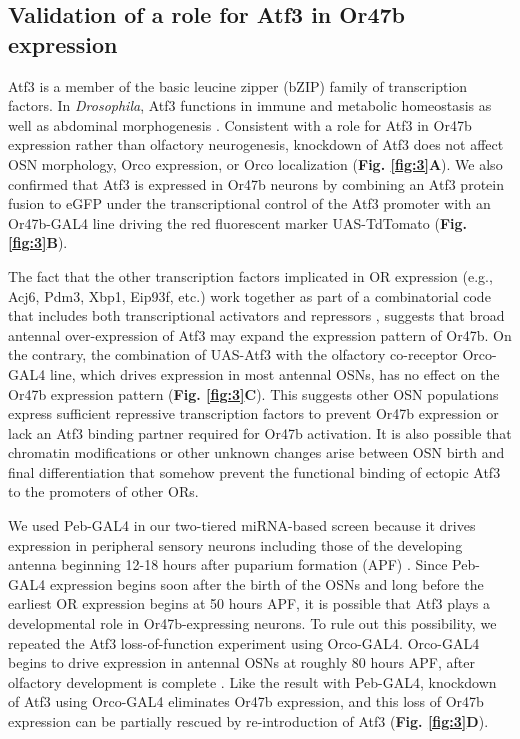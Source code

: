 \subsection*{Validation of a role for Atf3 in Or47b expression}

Atf3 is a member of the basic leucine zipper (bZIP) family of transcription factors.
In \emph{Drosophila}, Atf3 functions in immune and metabolic homeostasis as well as abdominal morphogenesis \cite{Brodesser_Jindra_Uhlirova_2012,a_Bohmann_Jindra_Uhlirova_2009}.
Consistent with a role for Atf3 in Or47b expression rather than olfactory neurogenesis, knockdown of Atf3 does not affect OSN morphology, Orco expression, or Orco localization (\textbf{Fig. \ref{fig:3}A}).
We also confirmed that Atf3 is expressed in Or47b neurons by combining an Atf3 protein fusion to eGFP under the transcriptional control of the Atf3 promoter with an Or47b-GAL4 line driving the red fluorescent marker UAS-TdTomato (\textbf{Fig. \ref{fig:3}B}).

The fact that the other transcription factors implicated in OR expression (e.g., Acj6, Pdm3, Xbp1, Eip93f, etc.) work together as part of a combinatorial code that includes both transcriptional activators and repressors \cite{Brochtrup_Hummel_Alenius_2012}, suggests that broad antennal over-expression of Atf3 may expand the expression pattern of Or47b.
On the contrary, the combination of UAS-Atf3 with the olfactory co-receptor Orco-GAL4 line, which drives expression in most antennal OSNs, has no effect on the Or47b expression pattern (\textbf{Fig. \ref{fig:3}C}).
This suggests other OSN populations express sufficient repressive transcription factors to prevent Or47b expression or lack an Atf3 binding partner required for Or47b activation.
It is also possible that chromatin modifications or other unknown changes arise between OSN birth and final differentiation that somehow prevent the functional binding of ectopic Atf3 to the promoters of other ORs.

We used Peb-GAL4 in our two-tiered miRNA-based screen because it drives expression in peripheral sensory neurons including those of the developing antenna beginning 12-18 hours after puparium formation (APF) \cite{dnik_Dickson_Luo_Komiyama_2007}.
Since Peb-GAL4 expression begins soon after the birth of the OSNs and long before the earliest OR expression begins at 50 hours APF, it is possible that Atf3 plays a developmental role in Or47b-expressing neurons.
To rule out this possibility, we repeated the Atf3 loss-of-function experiment using Orco-GAL4.
Orco-GAL4 begins to drive expression in antennal OSNs at roughly 80 hours APF, after olfactory development is complete \cite{s_Chiappe_Amrein_Vosshall_2004}.
Like the result with Peb-GAL4, knockdown of Atf3 using Orco-GAL4 eliminates Or47b expression, and this loss of Or47b expression can be partially rescued by re-introduction of Atf3 (\textbf{Fig. \ref{fig:3}D}).

